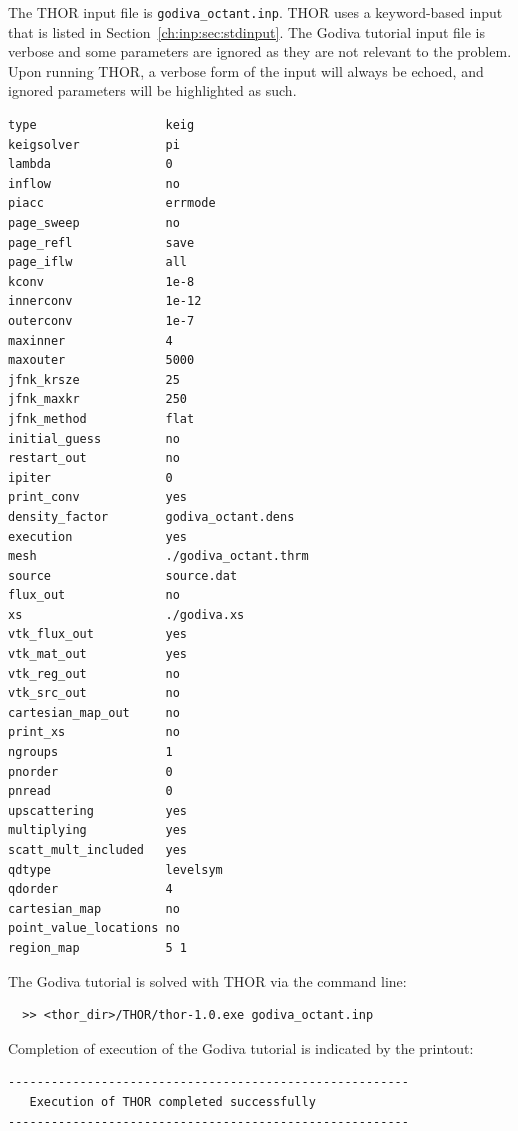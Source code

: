 The \ac{THOR} input file is \verb"godiva_octant.inp".
\ac{THOR} uses a keyword-based input that is listed in Section~\ref{ch:inp:sec:stdinput}.
The Godiva tutorial input file is verbose and some parameters are ignored as they are not relevant to the problem.
Upon running \ac{THOR}, a verbose form of the input will always be echoed, and ignored parameters will be highlighted as such.
\begin{verbatim}
type                  keig
keigsolver            pi
lambda                0
inflow                no
piacc                 errmode
page_sweep            no
page_refl             save
page_iflw             all
kconv                 1e-8
innerconv             1e-12
outerconv             1e-7
maxinner              4
maxouter              5000
jfnk_krsze            25
jfnk_maxkr            250
jfnk_method           flat
initial_guess         no
restart_out           no
ipiter                0
print_conv            yes
density_factor        godiva_octant.dens
execution             yes
mesh                  ./godiva_octant.thrm
source                source.dat
flux_out              no
xs                    ./godiva.xs
vtk_flux_out          yes
vtk_mat_out           yes
vtk_reg_out           no
vtk_src_out           no
cartesian_map_out     no
print_xs              no
ngroups               1
pnorder               0
pnread                0
upscattering          yes
multiplying           yes
scatt_mult_included   yes
qdtype                levelsym
qdorder               4
cartesian_map         no
point_value_locations no
region_map            5 1
\end{verbatim}

The Godiva tutorial is solved with \ac{THOR} via the command line:
\begin{verbatim}
  >> <thor_dir>/THOR/thor-1.0.exe godiva_octant.inp
\end{verbatim}

Completion of execution of the Godiva tutorial is indicated by the printout:
\begin{verbatim}
--------------------------------------------------------
   Execution of THOR completed successfully
--------------------------------------------------------
\end{verbatim}

